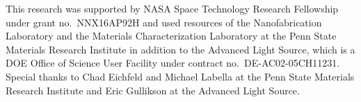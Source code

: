 \documentclass{aastex63}
\begin{document}
\acknowledgments
This research was supported by NASA Space Technology Research Fellowship under grant no.\ NNX16AP92H and used resources of the Nanofabrication Laboratory and the Materials Characterization Laboratory at the Penn State Materials Research Institute in addition to the Advanced Light Source, which is a DOE Office of Science User Facility under contract no.\ DE-AC02-05CH11231. Special thanks to Chad Eichfeld and Michael Labella at the Penn State Materials Research Institute and Eric Gullikson at the Advanced Light Source.  

%





{}



\end{document}
